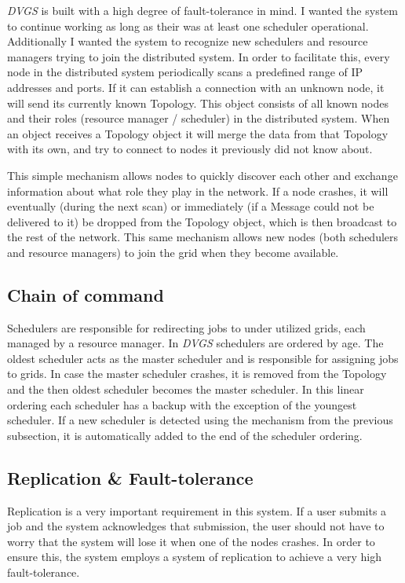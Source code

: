 \documentclass{article}
\begin{document}
\textit{DVGS} is built with a high degree of fault-tolerance in mind. I wanted the system to continue working as long as their was at least one scheduler operational. Additionally I wanted the system to recognize new schedulers and resource managers trying to join the distributed system. In order to facilitate this, every node in the distributed system periodically scans a predefined range of IP addresses and ports. If it can establish a connection with an unknown node, it will send its currently known Topology. This object consists of all known nodes and their roles (resource manager / scheduler) in the distributed system. When an object receives a Topology object it will merge the data from that Topology with its own, and try to connect to nodes it previously did not know about. 

This simple mechanism allows nodes to quickly discover each other and exchange information about what role they play in the network. If a node crashes, it will eventually (during the next scan) or immediately (if a Message could not be delivered to it) be dropped from the Topology object, which is then broadcast to the rest of the network. This same mechanism allows new nodes (both schedulers and resource managers) to join the grid when they become available.

\subsection{Chain of command}

Schedulers are responsible for redirecting jobs to under utilized grids, each managed by a resource manager. In \textit{DVGS} schedulers are ordered by age. The oldest scheduler acts as the master scheduler and is responsible for assigning jobs to grids. In case the master scheduler crashes, it is removed from the Topology and the then oldest scheduler becomes the master scheduler. In this linear ordering each scheduler has a backup with the exception of the youngest scheduler. If a new scheduler is detected using the mechanism from the previous subsection, it is automatically added to the end of the scheduler ordering.

\subsection{Replication \& Fault-tolerance}

Replication is a very important requirement in this system. If a user submits a job and the system acknowledges that submission, the user should not have to worry that the system will lose it when one of the nodes crashes. In order to ensure this, the system employs a system of replication to achieve a very high fault-tolerance.
\end{document}
